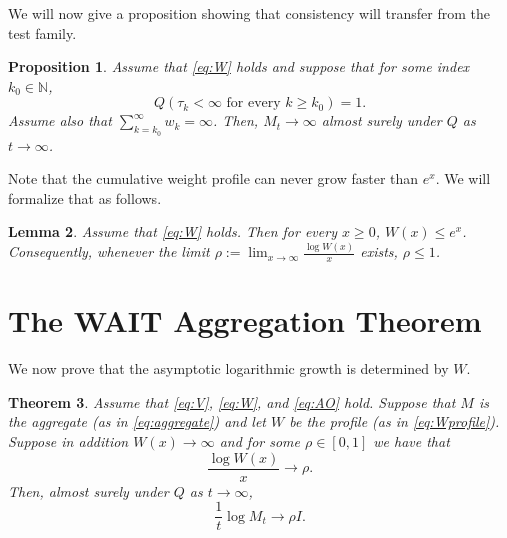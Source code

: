 \documentclass{article}
\newtheorem{theorem}{Theorem}[section]
\newtheorem{proposition}[theorem]{Proposition}
\newtheorem{lemma}[theorem]{Lemma}
\theoremstyle{definition}
\begin{document}
We will now give a proposition showing that consistency will transfer from the test family.

\begin{proposition}\label{prop:consistency-transfer}
Assume that \eqref{eq:W} holds and suppose that for some index $k_0\in\mathbb N$,
\begin{equation}\label{eq:C}
Q(\tau_k<\infty \text{ for every }k\ge k_0)=1.  
\end{equation}
Assume also that $\sum_{k=k_0}^\infty w_k=\infty$. Then, $M_t\to\infty$ almost surely under $Q$ as $t\to\infty$.
\end{proposition}

Note that the cumulative weight profile can never grow faster than $e^x$. We will formalize that as follows.

\begin{lemma}\label{lem:profile-upper-bound}
Assume that \eqref{eq:W} holds. Then for every $x\ge 0$, $W(x)\le e^x$. Consequently, whenever the limit $\rho:=\lim_{x\to\infty}\frac{\log W(x)}{x}$ exists, $\rho\le 1$.
\end{lemma}

\section{The WAIT Aggregation Theorem}\label{sec:cute}

We now prove that the asymptotic logarithmic growth is determined by $W$.

\begin{theorem}\label{thm:main}
Assume that \eqref{eq:V}, \eqref{eq:W}, and \eqref{eq:AO} hold. Suppose that $M$ is the aggregate (as in \eqref{eq:aggregate}) and let $W$ be the profile (as in \eqref{eq:Wprofile}). Suppose in addition $W(x)\to\infty$ and for some $\rho\in[0,1]$ we have that
    \begin{equation}\label{eq:R}
    \frac{\log W(x)}{x}\longrightarrow \rho.   
    \end{equation}
    Then, almost surely under $Q$ as $t\to\infty$,
    \begin{equation}\label{eq:G}
    \boxed{
    \frac{1}{t}\log M_t\longrightarrow \rho I.  
    }
    \end{equation}
\end{theorem}
\end{document}

